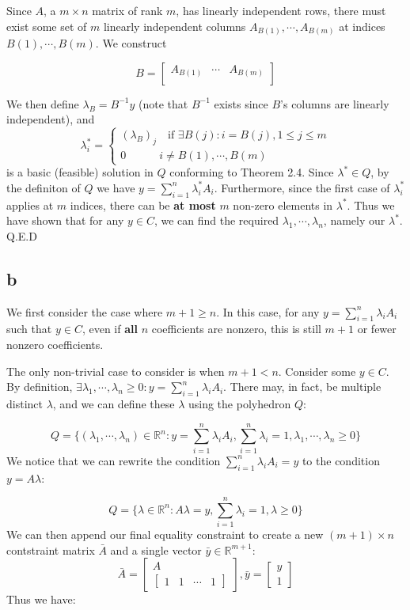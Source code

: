 \documentclass[11pt]{article}
\begin{document}
Since $A$, a $m\times n$ matrix of rank $m$, has linearly independent rows, there must exist some set of $m$ linearly independent columns $A_{B(1)},\cdots, A_{B(m)}$ at indices $B(1),\cdots, B(m)$. We construct

$$
B=\begin{bmatrix}
A_{B(1)} & \cdots & A_{B(m)} \\
\end{bmatrix}
$$

We then define $\lambda_B=B^{-1}y$ (note that $B^{-1}$ exists since $B$'s columns are linearly independent), and
$$
\lambda_i^* = \begin{cases}
(\lambda_B)_j\quad \text{if }\exists B(j):i=B(j), 1\leq j\leq m\\
0\quad\quad\quad i\neq B(1), \cdots, B(m)
\end{cases}
$$
is a basic (feasible) solution in $Q$ conforming to Theorem 2.4. Since $\lambda^*\in Q$, by the definiton of $Q$ we have $y=\sum_{i=1}^n\lambda_i^*A_i$. Furthermore, since the first case of $\lambda_i^*$ applies at $m$ indices, there can be \textbf{at most} $m$ non-zero elements in $\lambda^*$. Thus we have shown that for any $y\in C$, we can find the required $\lambda_1,\cdots, \lambda_n$, namely our $\lambda^*$. Q.E.D

\subsection*{b}

We first consider the case where $m+1\geq n$. In this case, for any $y=\sum_{i=1}^n\lambda_iA_i$ such that $y\in C$, even if \textbf{all} $n$ coefficients are nonzero, this is still $m+1$ or fewer nonzero coefficients.

The only non-trivial case to consider is when $m+1<n$. Consider some $y\in C$. By definition, $\exists \lambda_1, \cdots, \lambda_n\geq 0:y=\sum_{i=1}^n\lambda_i A_i$. There may, in fact, be multiple distinct $\lambda$, and we can define these $\lambda$ using the polyhedron $Q$:

$$
Q=\bigl\{(\lambda_1, \cdots,\lambda_n)\in\mathbb{R}^n:y=\sum_{i=1}^n\lambda_iA_i, \sum_{i=1}^n\lambda_i=1, \lambda_1, \cdots, \lambda_n \geq 0\bigr\}
$$
We notice that we can rewrite the condition $\sum_{i=1}^n\lambda_iA_i=y$ to the condition $y=A\lambda$:

$$
Q=\bigl\{\lambda\in\mathbb{R}^n:A\lambda=y, \sum_{i=1}^n\lambda_i=1, \lambda\geq 0\bigr\}
$$
We can then append our final equality constraint to create a new $(m+1)\times n$ contstraint matrix $\bar{A}$ and a single vector $\bar{y}\in\mathbb{R}^{m+1}$:
$$
\bar{A}=\begin{bmatrix}
A\\
\begin{bmatrix}
1&1&\cdots&1
\end{bmatrix}
\end{bmatrix}, 
\bar{y} = \begin{bmatrix}
y\\
1
\end{bmatrix}
$$
Thus we have:
\end{document}
